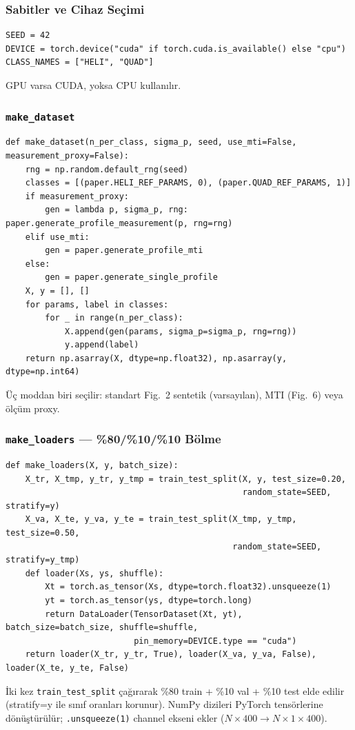 \documentclass[11pt,a4paper]{article}
\begin{document}
\subsubsection{Sabitler ve Cihaz Seçimi}
\begin{lstlisting}
SEED = 42
DEVICE = torch.device("cuda" if torch.cuda.is_available() else "cpu")
CLASS_NAMES = ["HELI", "QUAD"]
\end{lstlisting}
GPU varsa CUDA, yoksa CPU kullanılır.

\subsubsection{\texttt{make\_dataset}}
\begin{lstlisting}[caption={Bellekte dataset üret}]
def make_dataset(n_per_class, sigma_p, seed, use_mti=False, measurement_proxy=False):
    rng = np.random.default_rng(seed)
    classes = [(paper.HELI_REF_PARAMS, 0), (paper.QUAD_REF_PARAMS, 1)]
    if measurement_proxy:
        gen = lambda p, sigma_p, rng: paper.generate_profile_measurement(p, rng=rng)
    elif use_mti:
        gen = paper.generate_profile_mti
    else:
        gen = paper.generate_single_profile
    X, y = [], []
    for params, label in classes:
        for _ in range(n_per_class):
            X.append(gen(params, sigma_p=sigma_p, rng=rng))
            y.append(label)
    return np.asarray(X, dtype=np.float32), np.asarray(y, dtype=np.int64)
\end{lstlisting}
Üç moddan biri seçilir: standart Fig.~2 sentetik (varsayılan), MTI (Fig.~6) veya ölçüm proxy.

\subsubsection{\texttt{make\_loaders} — \%80/\%10/\%10 Bölme}
\begin{lstlisting}
def make_loaders(X, y, batch_size):
    X_tr, X_tmp, y_tr, y_tmp = train_test_split(X, y, test_size=0.20,
                                                random_state=SEED, stratify=y)
    X_va, X_te, y_va, y_te = train_test_split(X_tmp, y_tmp, test_size=0.50,
                                              random_state=SEED, stratify=y_tmp)
    def loader(Xs, ys, shuffle):
        Xt = torch.as_tensor(Xs, dtype=torch.float32).unsqueeze(1)
        yt = torch.as_tensor(ys, dtype=torch.long)
        return DataLoader(TensorDataset(Xt, yt), batch_size=batch_size, shuffle=shuffle,
                          pin_memory=DEVICE.type == "cuda")
    return loader(X_tr, y_tr, True), loader(X_va, y_va, False), loader(X_te, y_te, False)
\end{lstlisting}
İki kez \texttt{train\_test\_split} çağırarak \%80 train + \%10 val + \%10 test elde edilir
(stratify=y ile sınıf oranları korunur). NumPy dizileri PyTorch tensörlerine dönüştürülür;
\texttt{.unsqueeze(1)} channel ekseni ekler ($N \times 400 \rightarrow N \times 1 \times 400$).
\end{document}
